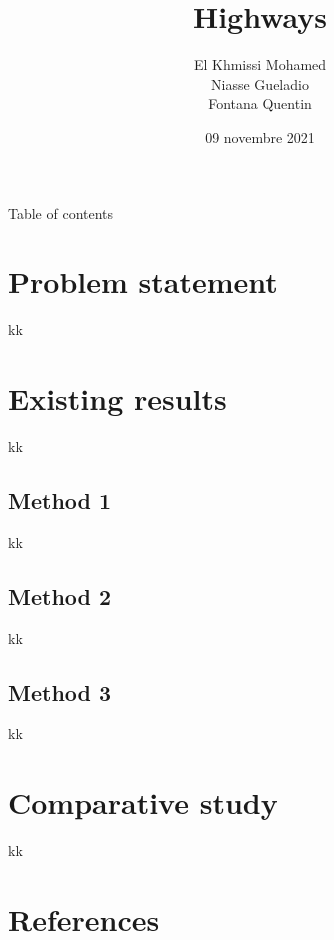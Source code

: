 \documentclass{beamer}
\title{Highways}
\author{El Khmissi Mohamed \\ Niasse Gueladio \\ Fontana Quentin }
\date{09 novembre 2021}
\begin{document}
\begin{frame}
    \titlepage 
\end{frame}
\begin{frame}{Table of contents}
    \tableofcontents
\end{frame}


\section{Problem statement}
\begin{frame}
kk 
\end{frame}
\section{Existing results}
\begin{frame}
kk 
\end{frame}
    \subsection{Method 1}
\begin{frame}
kk 
\end{frame}
    \subsection{Method 2}
\begin{frame}
kk 
\end{frame}
    \subsection{Method 3}
\begin{frame}
kk 
\end{frame}
\section{Comparative study}
\begin{frame}
kk 
\end{frame}
\section{References}

\begin{frame}
\end{frame}
 
\end{document}
